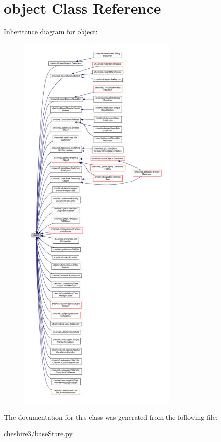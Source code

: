 \hypertarget{classobject}{\section{object Class Reference}
\label{classobject}
}


Inheritance diagram for object\-:
\nopagebreak
\begin{figure}[H]
\begin{center}
\leavevmode
\includegraphics[height=550pt]{classobject__inherit__graph}
\end{center}
\end{figure}


The documentation for this class was generated from the following file\-:\begin{DoxyCompactItemize}
\item 
cheshire3/base\-Store.\-py\end{DoxyCompactItemize}

